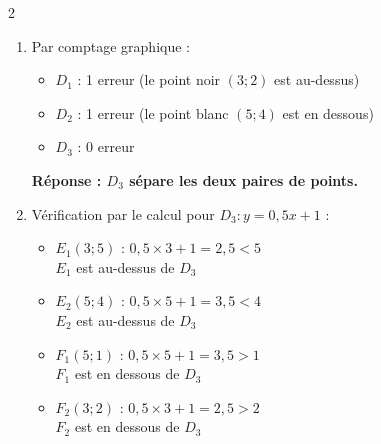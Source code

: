 \begin{multicols}{2}
\begin{enumerate}
\begin{itemize}
					            Équation : $\boldsymbol{y = 0{,}5x}$

					      \item $D_2$ passe par $B(2;3)$ : $3 = 0{,}5 \times 2 + p$ donc $p = 2$.

					            Équation : $\boldsymbol{y = 0{,}5x + 2}$

					      \item $D_3$ passe par $C(0;1)$ : $1 = 0{,}5 \times 0 + p$ donc $p = 1$.

					            Équation : $\boldsymbol{y = 0{,}5x + 1}$
				      \end{itemize}

				\item Par comptage graphique :
				      \begin{itemize}
					      \item $D_1$ : 1 erreur (le point noir $(3;2)$ est au-dessus)
					      \item $D_2$ : 1 erreur (le point blanc $(5;4)$ est en dessous)
					      \item $D_3$ : 0 erreur
				      \end{itemize}

				      \textbf{Réponse : $D_3$ sépare les deux paires de points.}

				\item Vérification par le calcul pour $D_3 : y = 0{,}5x + 1$ :
				      \begin{itemize}
					      \item $E_1(3;5)$ : $0{,}5 \times 3 + 1 = 2{,}5 < 5$ \\  $E_1$ est au-dessus de $D_3$
					      \item $E_2(5;4)$ : $0{,}5 \times 5 + 1 = 3{,}5 < 4$ \\  $E_2$ est au-dessus de $D_3$
					      \item $F_1(5;1)$ : $0{,}5 \times 5 + 1 = 3{,}5 > 1$ \\  $F_1$ est en dessous de $D_3$
					      \item $F_2(3;2)$ : $0{,}5 \times 3 + 1 = 2{,}5 > 2$ \\  $F_2$ est en dessous de $D_3$
				      \end{itemize}

			\end{enumerate}
		\end{multicols}
